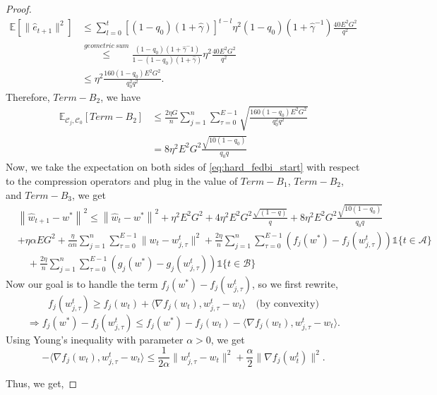 \documentclass{article} %
\DeclareMathOperator{\E}{\E}
\def\C{{\mathcal C}}
\def\E{{\mathbb E}}
\begin{document}
\begin{proof}
\begin{align*}
    \E[\|\hat{e}_{t+1}\|^2] &\leq \sum_{l=0}^{t}\left[(1-q_0)(1+\hat{\gamma})\right]^{t-l}\eta^2(1-q_0)(1+\hat{\gamma}^{-1})\frac{40 E^2G^2}{ q^2}
    \\
    &\overset{geometric\ sum}{\leq}\frac{(1-q_0)(1+\hat{\gamma}^-1)}{1- (1-q_0)(1+\hat{\gamma})}\eta^2\frac{40 E^2G^2}{ q^2}
    \\
    & \leq \eta^2 \frac{160(1-q_0) E^2G^2}{ q_0^2q^2}.
\end{align*}
Therefore, $Term-B_2$, we have
\begin{align*}
    \E_{\C_j,\C_0}\left[Term-B_2\right] &\leq \frac{2 \eta G}{n} \sum_{j=1}^n  \sum_{\tau=0}^{E-1}\sqrt{\frac{160(1-q_0) E^2G^2}{ q_0^2q^2}}
    \\
    & = 8\eta^2 E^2G^2\frac{\sqrt{10(1-q_0)}}{q_0q}
\end{align*}
Now, we take the expectation on both sides of \cref{eq:hard_fedbi_start} with respect to the compression operators and plug in the value of $Term-B_1$, $Term-B_2$, and $Term-B_3$, we get
\begin{equation}
\label{eq:fedbisgcm_hard}
    \begin{aligned}
        &\left\| \hat{w}_{t+1} - w^* \right\|^2 \leq \left\| \hat{w}_t - w^* \right\|^2 + \eta^2E^2G^2  + 4\eta^2E^2G^2\frac{\sqrt{(1-q)}}{q} + 8\eta^2 E^2 G^2 \frac{\sqrt{10(1-q_0)}}{q_0q}
        \\
        &+ \eta \alpha E G^2 + \frac{\eta}{\alpha n} \sum_{j=1}^n \sum_{\tau=0}^{E-1} \| w_t - w_{j,\tau}^t \|^2  + \frac{2\eta}{n} \sum_{j=1}^n \sum_{\tau=0}^{E-1} (f_j(w^*) - f_j(w_{j,\tau}^t))\mathds{1}\{t \in \mathcal{A}\} \\
        &\quad + \frac{2\eta}{n} \sum_{j=1}^n \sum_{\tau=0}^{E-1} (g_j(w^*) - g_j(w_{j,\tau}^t))\mathds{1}\{t \in \mathcal{B}\}
    \end{aligned}
\end{equation}
Now our goal is to handle the term \( f_j(w^*) - f_j(w_{j,\tau}^t) \), so we first rewrite,
\[
f_j(w_{j,\tau}^t) \geq f_j(w_t) + \langle \nabla f_j(w_t), w_{j,\tau}^t - w_t \rangle \quad \text{(by convexity)}
\]
\[
\Rightarrow f_j(w^*) - f_j(w_{j,\tau}^t) 
\leq f_j(w^*) - f_j(w_t) - \langle \nabla f_j(w_t), w_{j,\tau}^t - w_t \rangle.
\]
Using Young's inequality with parameter \(\alpha > 0\), we get
\[
-\langle \nabla f_j(w_t), w_{j,\tau}^t - w_t \rangle 
\leq \frac{1}{2\alpha} \| w_{j,\tau}^t - w_t \|^2 + \frac{\alpha}{2} \| \nabla f_j(w_t^t) \|^2.
\]

Thus, we get,


\end{proof}
\end{document}
